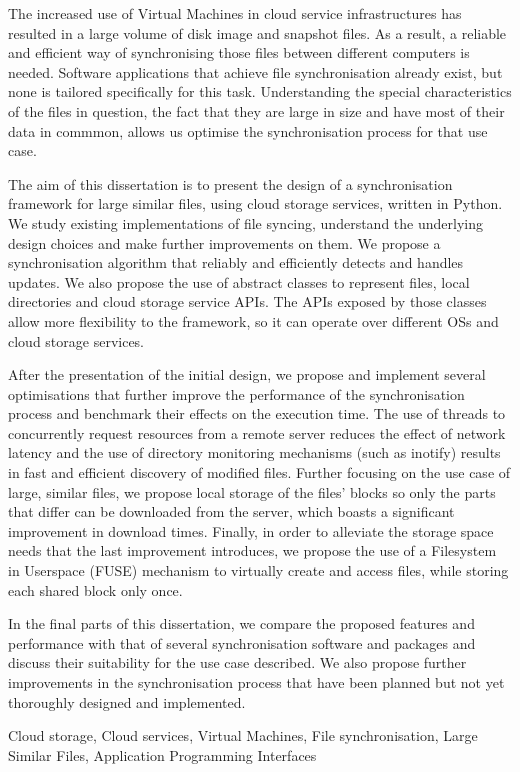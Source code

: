 \begin{abstracten}
  The increased use of Virtual Machines in cloud service infrastructures has resulted in a large volume of disk image and snapshot files. As a result, a reliable and efficient way of synchronising those files between different computers is needed. Software applications that achieve file synchronisation already exist, but none is tailored specifically for this task. Understanding the special characteristics of the files in question, the fact that they are large in size and have most of their data in commmon, allows us optimise the synchronisation process for that use case.

  The aim of this dissertation is to present the design of a synchronisation framework for large similar files, using cloud storage services, written in Python. We study existing implementations of file syncing, understand the underlying design choices and make further improvements on them. We propose a synchronisation algorithm that reliably and efficiently detects and handles updates. We also propose the use of abstract classes to represent files, local directories and cloud storage service APIs. The APIs exposed by those classes allow more flexibility to the framework, so it can operate over different OSs and cloud storage services.

  After the presentation of the initial design, we propose and implement several optimisations that further improve the performance of the synchronisation process and benchmark their effects on the execution time. The use of threads to concurrently request resources from a remote server reduces the effect of network latency and the use of directory monitoring mechanisms (such as inotify) results in fast and efficient discovery of modified files. Further focusing on the use case of large, similar files, we propose local storage of the files' blocks so only the parts that differ can be downloaded from the server, which boasts a significant improvement in download times. Finally, in order to alleviate the storage space needs that the last improvement introduces, we propose the use of a Filesystem in Userspace (FUSE) mechanism to virtually create and access files, while storing each shared block only once.

  In the final parts of this dissertation, we compare the proposed features and performance with that of several synchronisation software and packages and discuss their suitability for the use case described. We also propose further improvements in the synchronisation process that have been planned but not yet thoroughly designed and implemented.

\begin{keywordsen}
    Cloud storage, Cloud services, Virtual Machines, File synchronisation, Large Similar Files, Application Programming Interfaces
\end{keywordsen}
\end{abstracten}


